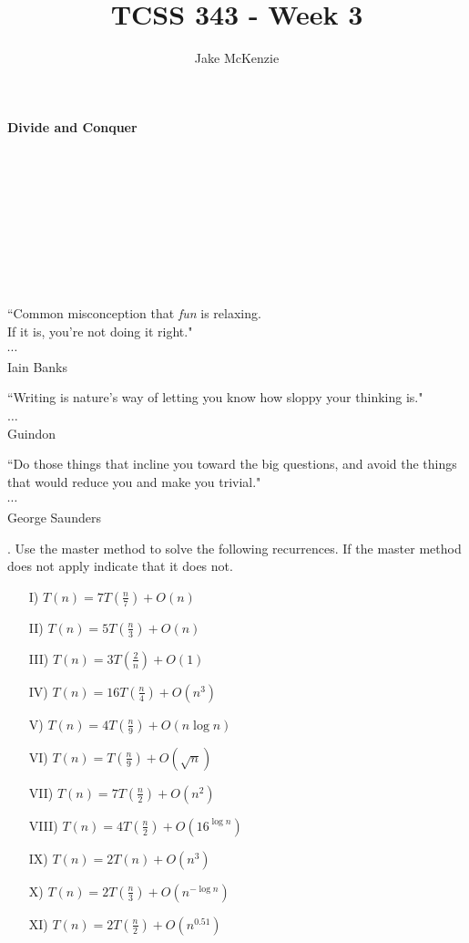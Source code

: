 \documentclass[12pt]{article}
\begin{document}
\title{TCSS 343 - Week 3}
\author{Jake McKenzie}
\maketitle
\noindent\centerline{\textbf{Divide and Conquer}}\\\\\\\\\\\\\\\\
\begin{center}
    ``Common misconception that \textit{fun} is relaxing. \\If it is, you’re not doing it right." \\$\cdots$\\ Iain Banks
\end{center}
\begin{center}
    ``Writing is nature's way of letting you know how sloppy your thinking is." \\
    $\dots$\\
    Guindon
\end{center}
\begin{center}
    ``Do those things that incline you toward the big questions, and avoid the things that would reduce you and make you trivial." \\$\cdots$\\ George Saunders 
\end{center}
. Use the master method to solve the following recurrences. If the master method does not apply indicate that it does not.
\begin{enumerate}
    \item[I)]$T(n) = 7T(\frac{n}{7}) + O(n)$
    \item[II)]$T(n) = 5T(\frac{n}{3}) + O(n)$
    \item[III)]$T(n) = 3T(\frac{2}{n}) + O(1)$
    \item[IV)]$T(n) = 16T(\frac{n}{4}) + O(n^3)$
    \item[V)]$T(n) = 4T(\frac{n}{9}) + O(n \log{n})$
    \item[VI)]$T(n) = T(\frac{n}{9}) + O(\sqrt{n})$
    \item[VII)]$T(n) = 7T(\frac{n}{2}) + O(n^2)$
    \item[VIII)]$T(n) = 4T(\frac{n}{2}) + O(16^{\log{n}})$
    \item[IX)]$T(n) = 2T(n) + O(n^3)$
    \item[X)]$T(n) = 2T(\frac{n}{3}) + O(n^{-\log{n}})$
    \item[XI)]$T(n) = 2T(\frac{n}{2}) + O(n^{0.51})$
\end{enumerate}
\end{document}
